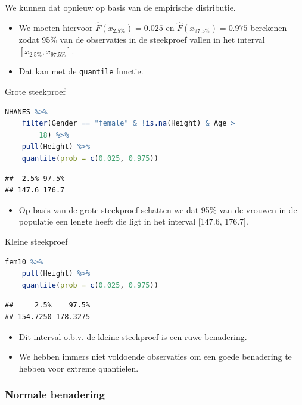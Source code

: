 \documentclass[
  12pt,dutch,coursenotes]{book}
\newcommand{\passthrough}[1]{#1}
\providecommand{\tightlist}{%
  \setlength{\itemsep}{0pt}\setlength{\parskip}{0pt}}
\theoremstyle{definition}
\theoremstyle{definition}
\theoremstyle{definition}
\theoremstyle{definition}
\theoremstyle{remark}
\begin{document}
We kunnen dat opnieuw op basis van de empirische distributie.

\begin{itemize}
\item
  We moeten hiervoor \(\hat{F}(x_{2.5\%})=0.025\) en \(\hat{F}(x_{97.5\%})=0.975\) berekenen zodat 95\% van de observaties in de steekproef vallen in het interval \([x_{2.5\%},x_{97.5\%}]\).
\item
  Dat kan met de \passthrough{\lstinline!quantile!} functie.
\end{itemize}

Grote steekproef

\begin{lstlisting}[language=R]
NHANES %>%
    filter(Gender == "female" & !is.na(Height) & Age >
        18) %>%
    pull(Height) %>%
    quantile(prob = c(0.025, 0.975))
\end{lstlisting}

\begin{lstlisting}
##  2.5% 97.5% 
## 147.6 176.7
\end{lstlisting}

\begin{itemize}
\tightlist
\item
  Op basis van de grote steekproef schatten we dat 95\% van de vrouwen in de populatie een lengte heeft die ligt in het interval {[}147.6, 176.7{]}.
\end{itemize}

Kleine steekproef

\begin{lstlisting}[language=R]
fem10 %>%
    pull(Height) %>%
    quantile(prob = c(0.025, 0.975))
\end{lstlisting}

\begin{lstlisting}
##     2.5%    97.5% 
## 154.7250 178.3275
\end{lstlisting}

\begin{itemize}
\tightlist
\item
  Dit interval o.b.v. de kleine steekproef is een ruwe benadering.
\item
  We hebben immers niet voldoende observaties om een goede benadering te hebben voor extreme quantielen.
\end{itemize}

\hypertarget{normale-benadering-1}{%
\subsubsection{Normale benadering}\label{normale-benadering-1}}
\end{document}
